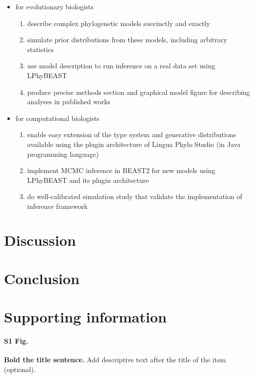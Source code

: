 \documentclass[10pt,letterpaper,table]{article}
\begin{document}
{\begin{itemize}
\item for evolutionary biologists
\begin{enumerate}
\item describe complex phylogenetic models succinctly and exactly
\item simulate prior distributions from these models, including arbitrary statistics
\item use model description to run inference on a real data set using LPhyBEAST
\item produce precise methods section and graphical model figure for describing analyses in published works
\end{enumerate}
\item for computational biologists
\begin{enumerate}
\item enable easy extension of the type system and generative distributions available using the plugin architecture of Lingua Phylo Studio (in Java programming language)
\item implement MCMC inference in BEAST2 for new models using LPhyBEAST and its plugin architecture
\item do well-calibrated simulation study that validate the implementation of inference framework
\end{enumerate}
\end{itemize}


\section*{Discussion}

\section*{Conclusion}

\section*{Supporting information}

\paragraph*{S1 Fig.}
\label{S1_Fig}
{\bf Bold the title sentence.} Add descriptive text after the title of the item (optional).

}
\end{document}
